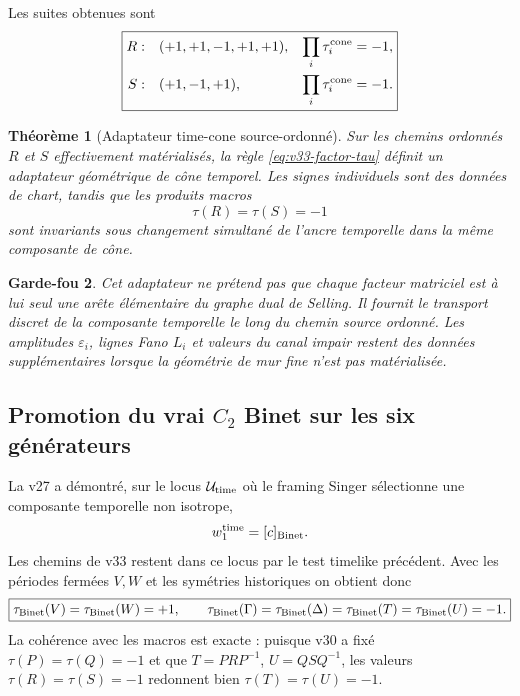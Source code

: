 \documentclass[11pt,a4paper]{article}
\newtheorem{theorem}{Théorème}[section]
\newtheorem{guardrail}[theorem]{Garde-fou}
\begin{document}
Les suites obtenues sont
\begin{equation}\label{eq:v33-RS-tau-sequences}
 \boxed{
 \begin{aligned}
 R:&\quad(+1,+1,-1,+1,+1),&\prod_i\tau_i^{\rm cone}&=-1,\\
 S:&\quad(+1,-1,+1),&\prod_i\tau_i^{\rm cone}&=-1.
 \end{aligned}}
\end{equation}

\begin{theorem}[Adaptateur time-cone source-ordonné]\label{thm:v33-RS-timecone}
Sur les chemins ordonnés $R$ et $S$ effectivement matérialisés, la règle
\eqref{eq:v33-factor-tau} définit un adaptateur géométrique de cône temporel. Les signes individuels
sont des données de chart, tandis que les produits macros
\[
 \boxed{\tau(R)=\tau(S)=-1}
\]
sont invariants sous changement simultané de l'ancre temporelle dans la même composante de cône.
\end{theorem}

\begin{guardrail}
Cet adaptateur ne prétend pas que chaque facteur matriciel est à lui seul une arête élémentaire du
graphe dual de Selling. Il fournit le transport discret de la composante temporelle le long du chemin
source ordonné. Les amplitudes $\varepsilon_i$, lignes Fano $L_i$ et valeurs du canal impair restent
des données supplémentaires lorsque la géométrie de mur fine n'est pas matérialisée.
\end{guardrail}

\subsection{Promotion du vrai \texorpdfstring{$C_2$}{C2} Binet sur les six générateurs}

La v27 a démontré, sur le locus $\mathcal U_{\rm time}$ où le framing Singer sélectionne une composante
temporelle non isotrope,
\[
 w_1^{\rm time}=[c]_{\rm Binet}.
\]
Les chemins de v33 restent dans ce locus par le test timelike précédent. Avec les périodes fermées
$V,W$ et les symétries historiques on obtient donc
\begin{equation}\label{eq:v33-Binet-character}
 \boxed{
 \tau_{\rm Binet}(V)=\tau_{\rm Binet}(W)=+1,
 \qquad
 \tau_{\rm Binet}(\Gamma)=\tau_{\rm Binet}(\Delta)
 =\tau_{\rm Binet}(T)=\tau_{\rm Binet}(U)=-1.}
\end{equation}
La cohérence avec les macros est exacte : puisque v30 a fixé
$\tau(P)=\tau(Q)=-1$ et que
$T=PRP^{-1}$, $U=QSQ^{-1}$, les valeurs $\tau(R)=\tau(S)=-1$ redonnent bien
$\tau(T)=\tau(U)=-1$.
\end{document}
